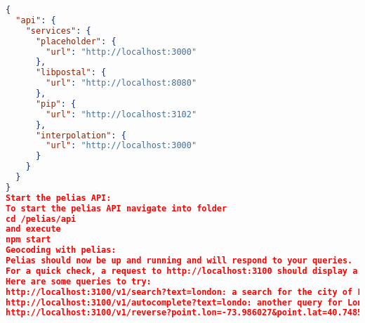 \begin{lstlisting}[language=json,breaklines=true]
{
  "api": {
    "services": {
      "placeholder": {
        "url": "http://localhost:3000"
      },
      "libpostal": {
        "url": "http://localhost:8080"
      },
      "pip": {
        "url": "http://localhost:3102"
      },
      "interpolation": {
        "url": "http://localhost:3000"
      }
    }
  }
}
Start the pelias API:
To start the pelias API navigate into folder
cd /pelias/api
and execute
npm start
Geocoding with pelias:
Pelias should now be up and running and will respond to your queries.
For a quick check, a request to http://localhost:3100 should display a link to the documentation for handy reference.
Here are some queries to try:
http://localhost:3100/v1/search?text=london: a search for the city of London.
http://localhost:3100/v1/autocomplete?text=londo: another query for London, but using the autocomplete endpoint which supports partial matches and is intended to be sent queries as a user types (note the query is for londo but London is returned)
http://localhost:3100/v1/reverse?point.lon=-73.986027&point.lat=40.748517: a reverse geocode for results near the Empire State Building in New York City.
\end{lstlisting}